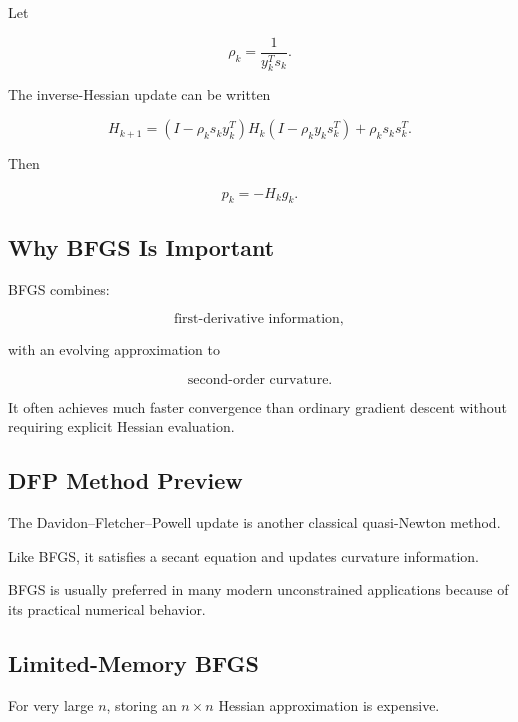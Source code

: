 Let

\[
\boxed{
\rho_k
=
\frac1{y_k^Ts_k}.
}
\]

The inverse-Hessian update can be written

\[
\boxed{
H_{k+1}
=
(
I-\rho_ks_ky_k^T
)
H_k
(
I-\rho_ky_ks_k^T
)
+
\rho_ks_ks_k^T.
}
\]

Then

\[
\boxed{
p_k
=
-H_kg_k.
}
\]

\subsection{Why BFGS Is Important}
\label{subsec:why-bfgs}

BFGS combines:

\[
\boxed{
\text{first-derivative information},
}
\]

with an evolving approximation to

\[
\boxed{
\text{second-order curvature}.
}
\]

It often achieves much faster convergence than ordinary gradient descent
without requiring explicit Hessian evaluation.

\subsection{DFP Method Preview}
\label{subsec:dfp-preview}

The Davidon--Fletcher--Powell update is another classical quasi-Newton
method.

Like BFGS, it satisfies a secant equation and updates curvature
information.

BFGS is usually preferred in many modern unconstrained applications
because of its practical numerical behavior.

\subsection{Limited-Memory BFGS}
\label{subsec:limited-memory-bfgs}

For very large \(n\), storing an \(n\times n\) Hessian approximation is
expensive.

